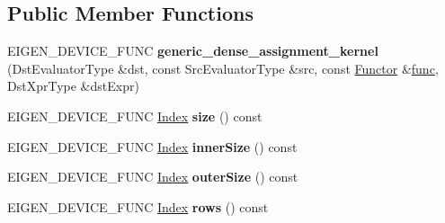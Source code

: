 \subsection*{Public Member Functions}
\begin{DoxyCompactItemize}
\item 
\mbox{\label{class_eigen_1_1internal_1_1generic__dense__assignment__kernel_a78626a9a6997a4e2402b2a4c2f841aa7}} 
E\+I\+G\+E\+N\+\_\+\+D\+E\+V\+I\+C\+E\+\_\+\+F\+U\+NC {\bfseries generic\+\_\+dense\+\_\+assignment\+\_\+kernel} (Dst\+Evaluator\+Type \&dst, const Src\+Evaluator\+Type \&src, const \hyperlink{struct_functor}{Functor} \&\hyperlink{structfunc}{func}, Dst\+Xpr\+Type \&dst\+Expr)
\item 
\mbox{\label{class_eigen_1_1internal_1_1generic__dense__assignment__kernel_a82a9cc7d42ec2577722ed15a829b77bd}} 
E\+I\+G\+E\+N\+\_\+\+D\+E\+V\+I\+C\+E\+\_\+\+F\+U\+NC \hyperlink{namespace_eigen_a62e77e0933482dafde8fe197d9a2cfde}{Index} {\bfseries size} () const
\item 
\mbox{\label{class_eigen_1_1internal_1_1generic__dense__assignment__kernel_aca5b2865e530f046e184124034fc079d}} 
E\+I\+G\+E\+N\+\_\+\+D\+E\+V\+I\+C\+E\+\_\+\+F\+U\+NC \hyperlink{namespace_eigen_a62e77e0933482dafde8fe197d9a2cfde}{Index} {\bfseries inner\+Size} () const
\item 
\mbox{\label{class_eigen_1_1internal_1_1generic__dense__assignment__kernel_a5e3f6c72327428a8579436ad0eacaa56}} 
E\+I\+G\+E\+N\+\_\+\+D\+E\+V\+I\+C\+E\+\_\+\+F\+U\+NC \hyperlink{namespace_eigen_a62e77e0933482dafde8fe197d9a2cfde}{Index} {\bfseries outer\+Size} () const
\item 
\mbox{\label{class_eigen_1_1internal_1_1generic__dense__assignment__kernel_af2b7c2682462c20bc08a6e30f9215e4f}} 
E\+I\+G\+E\+N\+\_\+\+D\+E\+V\+I\+C\+E\+\_\+\+F\+U\+NC \hyperlink{namespace_eigen_a62e77e0933482dafde8fe197d9a2cfde}{Index} {\bfseries rows} () const
\item 
\mbox{\label{class_eigen_1_1internal_1_1generic__dense__assignment__kernel_ab407bdaab83a8c681a46a2ff497dbb7c}} 

\end{DoxyCompactItemize}
